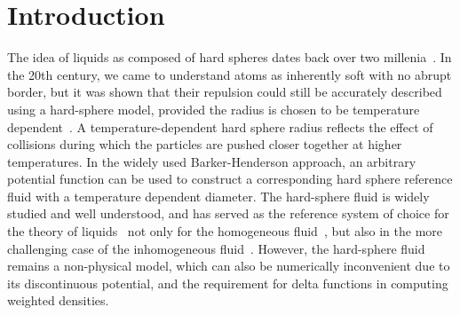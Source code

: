 \documentclass[letterpaper,twocolumn,amsmath,amssymb,prb]{revtex4-1}
\begin{document}


\section{Introduction}
The idea of liquids as composed of hard spheres dates back over two
millenia~\cite{lucretius}.  In the 20th century, we came to understand atoms as
inherently soft with no abrupt border, but it was shown that their repulsion
could still be accurately described using a hard-sphere model, provided the
radius is chosen to be temperature dependent~\cite{rowlinson1964statistical,
barker1967perturbation, andersen1971relationship}. A temperature-dependent hard
sphere radius reflects the effect of collisions during which the particles are
pushed closer together at higher temperatures. In the widely used
Barker-Henderson approach, an arbitrary potential function can be used to
construct a corresponding hard sphere reference fluid with a temperature
dependent diameter.
The hard-sphere fluid is widely studied and well understood, and
has served as the reference system of choice for the theory of
liquids~\cite{gil-villegas-1997-SAFT-VR, clark2006developing,
  lafitte2013accurate} not only for the homogeneous
fluid~\cite{carnahan1969equation}, but also in the more challenging
case of the inhomogeneous fluid~\cite{rosenfeld1989, rosenfeld1997, 
roth2002whitebear}.  However, the hard-sphere fluid remains a
non-physical model, which can also be numerically inconvenient due to its
discontinuous potential, and the requirement for delta functions in
computing weighted densities.
\end{document}
